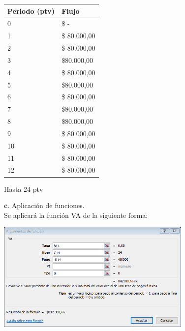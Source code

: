 \begin{spacing}{1.1}
    \begin{center}
        \begin{tabular}{|p{4cm}|p{4cm}|}
        \hline 
            \textbf{Periodo (ptv)} & \textbf{Flujo}  \\ \hline                        

           
            0 & \$ -  \\ \hline
            1 & \$ 80.000,00  \\ \hline
            2 & \$ 80.000,00   \\ \hline
            3 & \$80.000,00   \\ \hline
            4 & \$  80.000,00 \\ \hline
            5 & \$80.000,00   \\ \hline
            6 & \$ 80.000,00 \\ \hline
            7 & \$80.000,00   \\ \hline
            8 & \$80.000,00 \\ \hline
            9 & \$ 80.000,00 \\ \hline
            10 & \$ 80.000,00 \\ \hline
            11 & \$  80.000,00  \\ \hline
            12 & \$  80.000,00  \\ \hline    
 
\end{tabular}
\end{center}
\begin{center} Hasta 24 ptv \end{center}
\end{spacing}



\textbf{c}. Aplicación de funciones.
 \\
 
Se aplicará la función VA de la siguiente forma:     
 
 \begin{center}
	\includegraphics[height=5.4cm]{img/ch8/8_4.png}
\end{center}

